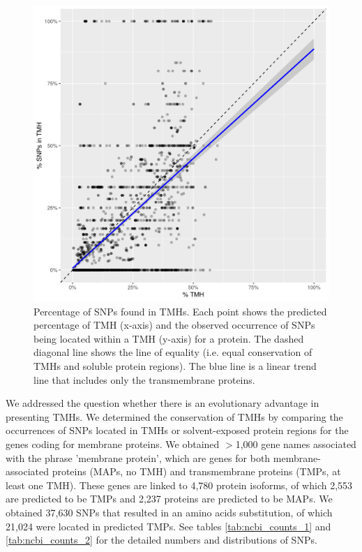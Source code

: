 \begin{figure}[!htbp]
  \includegraphics[width=\textwidth]{ncbi_peregrine_results/fig_f_snps_found_and_expected.png}
  \caption{
    Percentage of SNPs found in TMHs.
    Each point shows the predicted percentage of
    TMH (x-axis) and the observed occurrence of SNPs being located
    within a TMH (y-axis) for a protein.
    The dashed diagonal line shows the line of equality (i.e.
    equal conservation of TMHs and soluble protein regions).
    The blue line is a linear trend line that includes only the
    transmembrane proteins.
  }
  \label{fig:f_snps_found_and_expected}
\end{figure}

We addressed the question whether there is an evolutionary advantage in presenting TMHs. We determined the conservation of TMHs by comparing the occurrences of SNPs located in TMHs or solvent-exposed protein regions for the genes coding for membrane proteins.
We obtained $>$1,000 gene names associated with the phrase 'membrane protein',
which are genes for both membrane-associated proteins (MAPs, no TMH) and 
transmembrane proteins (TMPs, at least one TMH).
These genes are linked to 4,780 protein isoforms, 
of which 2,553 are predicted to be TMPs and 
2,237 proteins are predicted to be MAPs.
We obtained 37,630 SNPs that resulted in an
amino acids substitution, of which 21,024 were located 
in predicted TMPs.
See tables \ref{tab:ncbi_counts_1} and \ref{tab:ncbi_counts_2} 
for the detailed numbers and distributions of SNPs.

